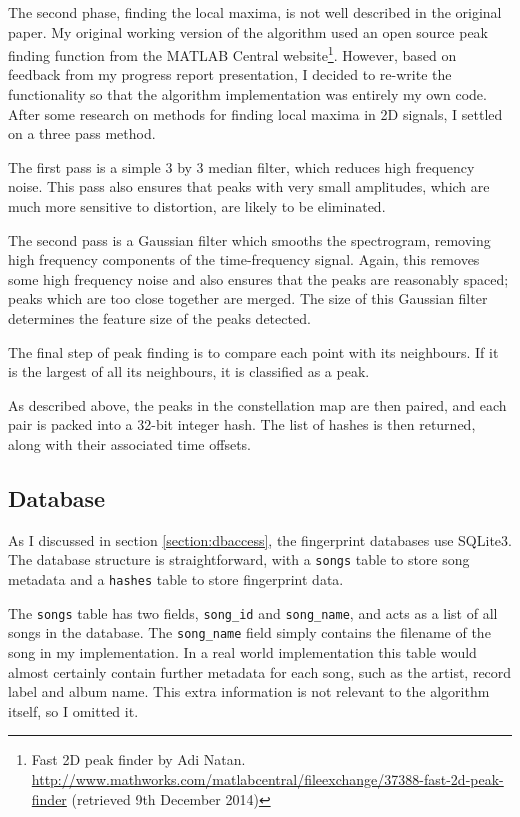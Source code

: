 \documentclass[12pt,a4paper,twoside,openright]{report}
\begin{document}
The second phase, finding the local maxima, is not well described in the original paper. My original working version of the algorithm used an open source peak finding function from the MATLAB Central website\footnote{Fast 2D peak finder by Adi Natan. \url{http://www.mathworks.com/matlabcentral/fileexchange/37388-fast-2d-peak-finder} (retrieved 9th December 2014)}. However, based on feedback from my progress report presentation, I decided to re-write the functionality so that the algorithm implementation was entirely my own code. After some research on methods for finding local maxima in 2D signals, I settled on a three pass method. 

The first pass is a simple 3 by 3 median filter, which reduces high frequency noise. This pass also ensures that peaks with very small amplitudes, which are much more sensitive to distortion, are likely to be eliminated.

The second pass is a Gaussian filter which smooths the spectrogram, removing high frequency components of the time-frequency signal. Again, this removes some high frequency noise and also ensures that the peaks are reasonably spaced; peaks which are too close together are merged. The size of this Gaussian filter determines the feature size of the peaks detected. 

The final step of peak finding is to compare each point with its neighbours. If it is the largest of all its neighbours, it is classified as a peak.

As described above, the peaks in the constellation map are then paired, and each pair is packed into a 32-bit integer hash. The list of hashes is then returned, along with their associated time offsets.


\subsection{Database}
\label{shazam:db}

As I discussed in section \ref{section:dbaccess}, the fingerprint databases use SQLite3. The database structure is straightforward, with a \lstinline{songs} table to store song metadata and a \lstinline{hashes} table to store fingerprint data.

The \lstinline{songs} table has two fields, \lstinline{song_id} and \lstinline{song_name}, and acts as a list of all songs in the database. The \lstinline{song_name} field simply contains the filename of the song in my implementation. In a real world implementation this table would almost certainly contain further metadata for each song, such as the artist, record label and album name. This extra information is not relevant to the algorithm itself, so I omitted it.
\end{document}
